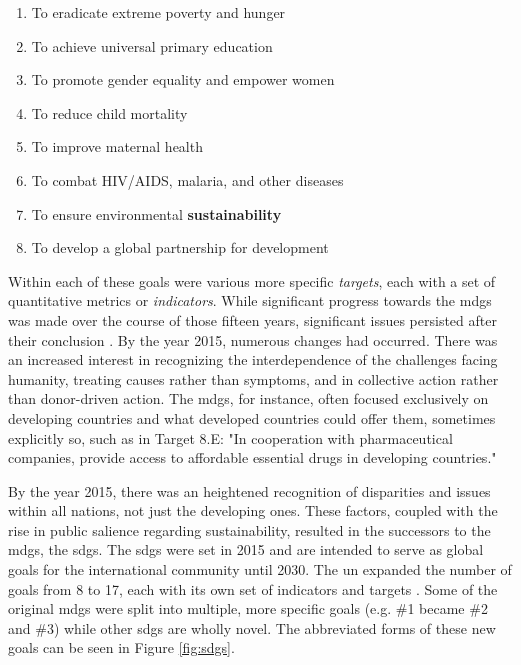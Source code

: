 \begin{enumerate} \setlength{\itemsep}{0pt} \setlength{\parskip}{0pt}
	\item To eradicate extreme poverty and hunger
	\item To achieve universal primary education
	\item To promote gender equality and empower women
	\item To reduce child mortality
	\item To improve maternal health
	\item To combat HIV/AIDS, malaria, and other diseases
	\item To ensure environmental \textbf{sustainability}
	\item To develop a global partnership for development
\end{enumerate}
    

Within each of these goals were various more specific \textit{targets}, each with a set of quantitative metrics or \textit{indicators}. While significant progress towards the \acp{mdg} was made over the course of those fifteen years, significant issues persisted after their conclusion \cite{inter-agencyandexpertgrouponmdgindicatorsMillenniumDevelopmentGoals2015}. By the year 2015, numerous changes had occurred. There was an increased interest in recognizing the interdependence of the challenges facing humanity, treating causes rather than symptoms, and in collective action rather than donor-driven action. The \acp{mdg}, for instance, often focused exclusively on developing countries and what developed countries could offer them, sometimes explicitly so, such as in Target 8.E: "In cooperation with pharmaceutical companies, provide access to affordable essential drugs in developing countries." 

By the year 2015, there was an heightened recognition of disparities and issues within all nations, not just the developing ones. These factors, coupled with the rise in public salience regarding sustainability, resulted in the successors to the \acp{mdg}, the \acp{sdg}. The \acp{sdg} were set in 2015 and are intended to serve as global goals for the international community until 2030. The \ac{un} expanded the number of goals from 8 to 17, each with its own set of indicators and targets \cite{unitednationsTransformingOurWorld2015}. Some of the original \acp{mdg} were split into multiple, more specific goals (e.g. \#1 became \#2 and \#3) while other \acp{sdg} are wholly novel. The abbreviated forms of these new goals can be seen in Figure \ref{fig:sdgs}.

